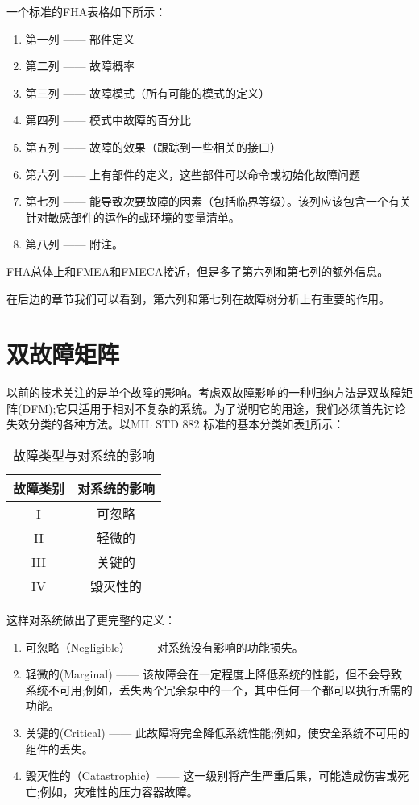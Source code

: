 \documentclass[cn,11pt,chinese]{elegantbook}
\begin{document}
一个标准的FHA表格如下所示：

\begin{enumerate}
	\item 第一列 —— 部件定义
	\item 第二列 —— 故障概率
	\item 第三列 —— 故障模式（所有可能的模式的定义）
	\item 第四列 —— 模式中故障的百分比
	\item 第五列 —— 故障的效果（跟踪到一些相关的接口）
	\item 第六列 —— 上有部件的定义，这些部件可以命令或初始化故障问题
	\item 第七列 —— 能导致次要故障的因素（包括临界等级）。该列应该包含一个有关针对敏感部件的运作的或环境的变量清单。
	\item 第八列 —— 附注。
\end{enumerate}

FHA总体上和FMEA和FMECA接近，但是多了第六列和第七列的额外信息。

在后边的章节我们可以看到，第六列和第七列在故障树分析上有重要的作用。

\section{双故障矩阵}

以前的技术关注的是单个故障的影响。考虑双故障影响的一种归纳方法是双故障矩阵(DFM);它只适用于相对不复杂的系统。为了说明它的用途，我们必须首先讨论失效分类的各种方法。以MIL STD 882 标准的基本分类如表\ref{tab:tab2_2}所示：


\begin{table}[htpb]
	\caption{故障类型与对系统的影响}\label{tab:tab2_2}
	\centering
	\begin{tabular}{@{}cc@{}}
		\toprule
		故障类别 & 对系统的影响 \\ \midrule
		I    & 可忽略    \\
		II   & 轻微的    \\
		III  & 关键的    \\
		IV   & 毁灭性的   \\ \bottomrule
	\end{tabular}
\end{table}

这样对系统做出了更完整的定义：

\begin{enumerate}
	\item 可忽略（Negligible）—— 对系统没有影响的功能损失。
	\item 轻微的(Marginal) —— 该故障会在一定程度上降低系统的性能，但不会导致系统不可用;例如，丢失两个冗余泵中的一个，其中任何一个都可以执行所需的功能。
	\item 关键的(Critical) —— 此故障将完全降低系统性能;例如，使安全系统不可用的组件的丢失。
	\item 毁灭性的（Catastrophic）—— 这一级别将产生严重后果，可能造成伤害或死亡;例如，灾难性的压力容器故障。
\end{enumerate}
\end{document}
